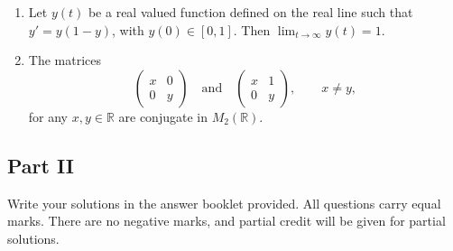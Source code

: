 \documentclass[11pt, a4paper]{article}
\begin{document}
\begin{enumerate}
  \item Let $y(t)$ be a real valued function defined on the real line such that $y' = y(1 - y)$, with $y(0) \in [0,1]$. Then $\lim_{t \to \infty} y(t) = 1$.
  \item The matrices
  \[
    \begin{pmatrix} x & 0 \\ 0 & y \end{pmatrix} \quad \text{and} \quad \begin{pmatrix} x & 1 \\ 0 & y \end{pmatrix}, \qquad x \ne y,
  \]
  for any $x, y \in \mathbb{R}$ are conjugate in $M_2(\mathbb{R})$.
\end{enumerate}

\subsection*{Part II}
Write your solutions in the answer booklet provided. All questions carry equal marks. There are no negative marks, and partial credit will be given for partial solutions.
\end{document}
